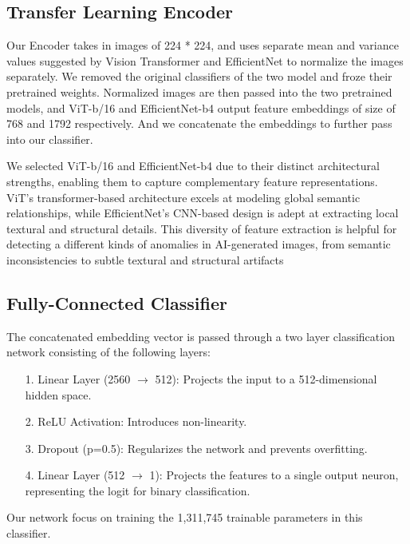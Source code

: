 \documentclass{article} %
\begin{document}
\subsection{Transfer Learning Encoder}

Our Encoder takes in images of 224 * 224, and uses separate mean and variance values suggested by Vision Transformer and EfficientNet to normalize the images separately.  We removed the original classifiers of the two model and froze their pretrained weights. Normalized images are then passed into the two pretrained models, and ViT-b/16 and EfficientNet-b4 output feature embeddings of size of 768 and 1792 respectively. And we concatenate the embeddings to further pass into our classifier. 

We selected ViT-b/16 and EfficientNet-b4 due to their distinct architectural strengths, enabling them to capture complementary feature representations. ViT's transformer-based architecture excels at modeling global semantic relationships, while EfficientNet's CNN-based design is adept at extracting local textural and structural details. This diversity of feature extraction is helpful for detecting a different kinds of anomalies in AI-generated images, from semantic inconsistencies to subtle textural and structural artifacts

\subsection{Fully-Connected Classifier}

The concatenated embedding vector is passed through a two layer classification network consisting of the following layers:
\begin{enumerate}
    \item[1.]Linear Layer (2560 $\rightarrow$ 512): Projects the input to a 512-dimensional hidden space.
    \item[2.]ReLU Activation: Introduces non-linearity.
    \item[3.]Dropout (p=0.5): Regularizes the network and prevents overfitting.
    \item[4.]Linear Layer (512 $\rightarrow$ 1): Projects the features to a single output neuron, representing the logit for binary classification.
\end{enumerate}
Our network focus on training the 1,311,745 trainable parameters in this classifier. 
\end{document}
